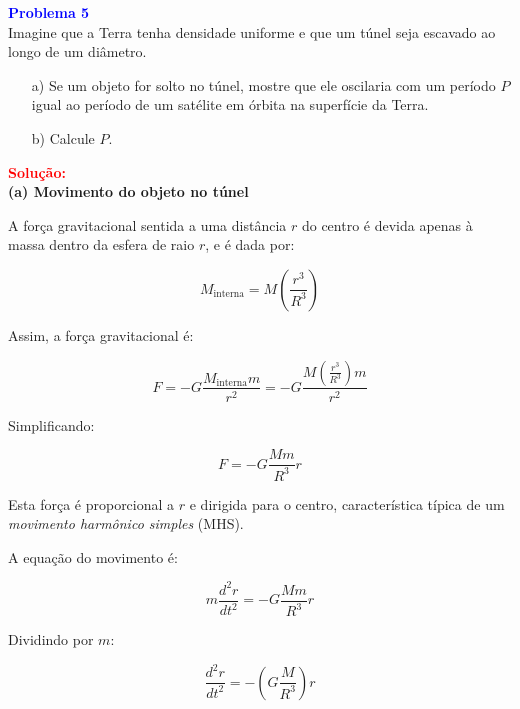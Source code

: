 \documentclass[a4paper,12pt]{article}
\begin{document}
\begin{flushleft}
\textbf{\textcolor{blue}{\Large Problema 5}}\\

Imagine que a Terra tenha densidade uniforme e que um túnel seja escavado ao longo de um diâmetro.

\begin{enumerate}
    \item[a)] Se um objeto for solto no túnel, mostre que ele oscilaria com um período \( P \) igual ao 
    período de um satélite em órbita na superfície da Terra.
    \item[b)] Calcule \( P \).
\end{enumerate}

\textcolor{red}{\textbf{Solução:}}\\

\textbf{(a) Movimento do objeto no túnel}

A força gravitacional sentida a uma distância \( r \) do centro é devida apenas à massa dentro da esfera de raio \( r \), e é dada por:

\begin{equation}
M_{\text{interna}} = M \left( \frac{r^3}{R^3} \right)
\end{equation}

Assim, a força gravitacional é:

\begin{equation}
F = - G \frac{M_{\text{interna}} m}{r^2} = -G \frac{M \left( \frac{r^3}{R^3} \right) m}{r^2}
\end{equation}

Simplificando:

\begin{equation}
F = -G \frac{M m}{R^3} r
\end{equation}

Esta força é proporcional a \( r \) e dirigida para o centro, característica típica de um \textit{movimento harmônico simples} (MHS).

A equação do movimento é:

\begin{equation}
m \frac{d^2r}{dt^2} = -G \frac{M m}{R^3} r
\end{equation}

Dividindo por \( m \):

\begin{equation}
\frac{d^2r}{dt^2} = -\left( G \frac{M}{R^3} \right) r
\end{equation}


\end{flushleft}
\end{document}
